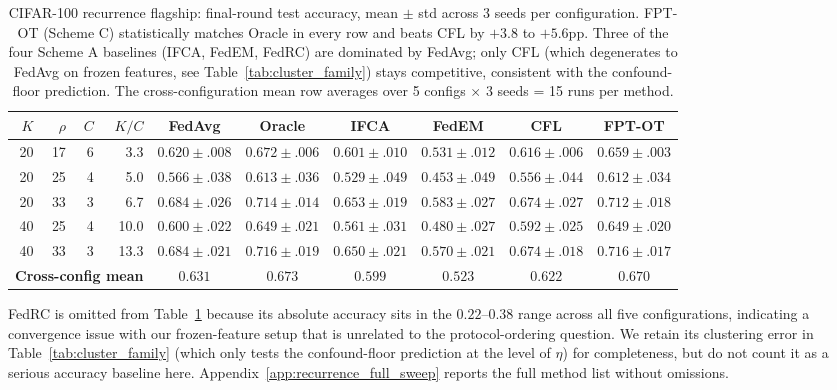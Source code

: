 \begin{table}[h]
\centering
\caption{CIFAR-100 recurrence flagship: final-round test accuracy, mean $\pm$ std across 3 seeds per configuration. FPT-OT (Scheme C) statistically matches Oracle in every row and beats CFL by $+3.8$ to $+5.6$pp. Three of the four Scheme A baselines (IFCA, FedEM, FedRC) are dominated by FedAvg; only CFL (which degenerates to FedAvg on frozen features, see Table~\ref{tab:cluster_family}) stays competitive, consistent with the confound-floor prediction. The cross-configuration mean row averages over 5 configs $\times$ 3 seeds = 15 runs per method.}
\label{tab:protocol_flagship}
\small
\setlength{\tabcolsep}{3pt}
\begin{tabular}{rrrrcccccc}
\toprule
$K$ & $\rho$ & $C$ & $K/C$ & FedAvg & Oracle & IFCA & FedEM & CFL & \textbf{FPT-OT} \\
\midrule
20 & 17 & 6 &  3.3 & $0.620 \pm .008$ & $0.672 \pm .006$ & $0.601 \pm .010$ & $0.531 \pm .012$ & $0.616 \pm .006$ & $\mathbf{0.659 \pm .003}$ \\
20 & 25 & 4 &  5.0 & $0.566 \pm .038$ & $0.613 \pm .036$ & $0.529 \pm .049$ & $0.453 \pm .049$ & $0.556 \pm .044$ & $\mathbf{0.612 \pm .034}$ \\
20 & 33 & 3 &  6.7 & $0.684 \pm .026$ & $0.714 \pm .014$ & $0.653 \pm .019$ & $0.583 \pm .027$ & $0.674 \pm .027$ & $\mathbf{0.712 \pm .018}$ \\
40 & 25 & 4 & 10.0 & $0.600 \pm .022$ & $0.649 \pm .021$ & $0.561 \pm .031$ & $0.480 \pm .027$ & $0.592 \pm .025$ & $\mathbf{0.649 \pm .020}$ \\
40 & 33 & 3 & 13.3 & $0.684 \pm .021$ & $0.716 \pm .019$ & $0.650 \pm .021$ & $0.570 \pm .021$ & $0.674 \pm .018$ & $\mathbf{0.716 \pm .017}$ \\
\midrule
\multicolumn{4}{l}{\textbf{Cross-config mean}} & $0.631$ & $0.673$ & $0.599$ & $0.523$ & $0.622$ & $\mathbf{0.670}$ \\
\bottomrule
\end{tabular}
\end{table}

FedRC is omitted from Table~\ref{tab:protocol_flagship} because its absolute accuracy sits in the $0.22$--$0.38$ range across all five configurations, indicating a convergence issue with our frozen-feature setup that is unrelated to the protocol-ordering question. We retain its clustering error in Table~\ref{tab:cluster_family} (which only tests the confound-floor prediction at the level of $\eta$) for completeness, but do not count it as a serious accuracy baseline here. Appendix~\ref{app:recurrence_full_sweep} reports the full method list without omissions.

